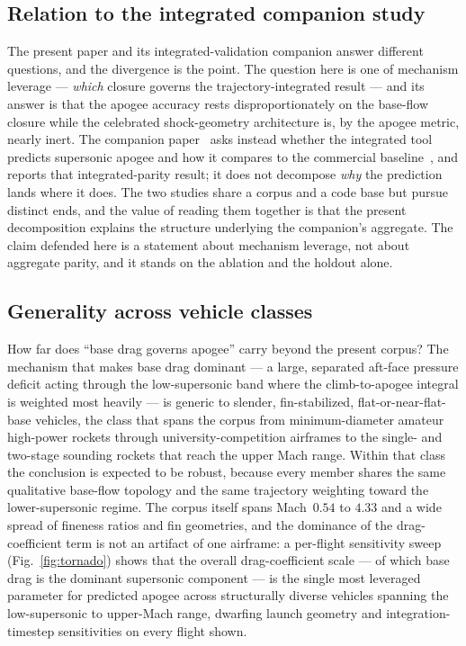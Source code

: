 \subsection{Relation to the integrated companion study}
\label{sec:disc-companion}

The present paper and its integrated-validation companion answer different
questions, and the divergence is the point. The question here is one of mechanism
leverage --- \emph{which} closure governs the trajectory-integrated result --- and
its answer is that the apogee accuracy rests disproportionately on the base-flow
closure while the celebrated shock-geometry architecture is, by the apogee metric,
nearly inert. The companion paper~\cite{yu2026jsr} asks instead whether the
integrated tool predicts supersonic apogee and how it compares to the commercial
baseline~\cite{rogers2015}, and reports that integrated-parity result; it does not
decompose \emph{why} the prediction lands where it does. The two studies share a
corpus and a code base but pursue distinct ends, and the value of reading them
together is that the present decomposition explains the structure underlying the
companion's aggregate. The claim defended here is a statement about mechanism
leverage, not about aggregate parity, and it stands on the ablation and the
holdout alone.

\subsection{Generality across vehicle classes}
\label{sec:disc-generality}

How far does ``base drag governs apogee'' carry beyond the present corpus? The
mechanism that makes base drag dominant --- a large, separated aft-face pressure
deficit acting through the low-supersonic band where the climb-to-apogee integral
is weighted most heavily --- is generic to slender, fin-stabilized,
flat-or-near-flat-base vehicles, the class that spans the corpus from minimum-diameter
amateur high-power rockets through university-competition airframes to the
single- and two-stage sounding rockets that reach the upper Mach range. Within
that class the conclusion is expected to be robust, because every member shares
the same qualitative base-flow topology and the same trajectory weighting toward
the lower-supersonic regime. The corpus itself spans Mach~$0.54$ to $4.33$ and a
wide spread of fineness ratios and fin geometries, and the dominance of the
drag-coefficient term is not an artifact of one airframe: a per-flight
sensitivity sweep (Fig.~\ref{fig:tornado}) shows that the overall drag-coefficient
scale --- of which base drag is the dominant supersonic component --- is the
single most leveraged parameter for predicted apogee across structurally diverse
vehicles spanning the low-supersonic to upper-Mach range, dwarfing launch
geometry and integration-timestep sensitivities on every flight shown.

